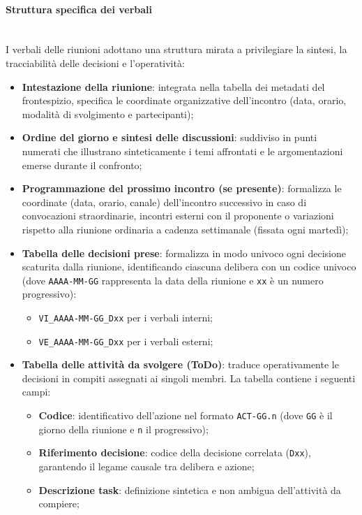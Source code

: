 \paragraph{Struttura specifica dei verbali}~\\[0.15cm]
I verbali delle riunioni adottano una struttura mirata a privilegiare la sintesi, la tracciabilità delle decisioni e l'operatività:
\begin{itemize}
    \item \textbf{Intestazione della riunione}: integrata nella tabella dei metadati del frontespizio, specifica le coordinate organizzative dell'incontro (data, orario, modalità di svolgimento e partecipanti);
    \item \textbf{Ordine del giorno e sintesi delle discussioni}: suddiviso in punti numerati che illustrano sinteticamente i temi affrontati e le argomentazioni emerse durante il confronto;
    \item \textbf{Programmazione del prossimo incontro (se presente)}: formalizza le coordinate (data, orario, canale) dell'incontro successivo in caso di convocazioni straordinarie, incontri esterni con il proponente o variazioni rispetto alla riunione ordinaria a cadenza settimanale (fissata ogni martedì);
    \item \textbf{Tabella delle decisioni prese}: formalizza in modo univoco ogni decisione scaturita dalla riunione, identificando ciascuna delibera con un codice univoco (dove \texttt{AAAA-MM-GG} rappresenta la data della riunione e \texttt{xx} è un numero progressivo):
    \begin{itemize}
        \item \texttt{VI\_AAAA-MM-GG\_Dxx} per i verbali interni;
        \item \texttt{VE\_AAAA-MM-GG\_Dxx} per i verbali esterni;
    \end{itemize}
    \item \textbf{Tabella delle attività da svolgere (ToDo)}: traduce operativamente le decisioni in compiti assegnati ai singoli membri. La tabella contiene i seguenti campi:
    \begin{itemize}
        \item \textbf{Codice}: identificativo dell'azione nel formato \texttt{ACT-GG.n} (dove \texttt{GG} è il giorno della riunione e \texttt{n} il progressivo);
        \item \textbf{Riferimento decisione}: codice della decisione correlata (\texttt{Dxx}), garantendo il legame causale tra delibera e azione;
        \item \textbf{Descrizione task}: definizione sintetica e non ambigua dell'attività da compiere;

\end{itemize}
\end{itemize}
